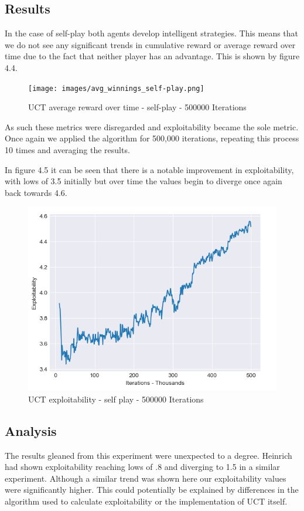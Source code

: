 \subsection{Results}\label{subsec:results2}
In the case of self-play both agents develop intelligent strategies.
This means that we do not see any significant trends in cumulative reward or average reward over time
due to the fact that neither player has an advantage.
This is shown by figure 4.4.
\begin{figure}[ht]
    \texttt{[image: images/avg\_winnings\_self-play.png]}
    \caption{UCT average reward over time - self-play - 500000 Iterations}
\end{figure}
As such these metrics were disregarded and exploitability became the sole metric.
Once again we applied the algorithm for 500,000 iterations, repeating this process 10 times
and averaging the results.

In figure 4.5 it can be seen that there is a notable improvement in exploitability, with lows of 3.5 initially
but over time the values begin to diverge once again back towards 4.6.

\begin{figure}[ht]
    \includegraphics[scale=.7]{images/exploitability_self-play_deterministic_500000.png}
    \caption{UCT exploitability - self play - 500000 Iterations}
\end{figure}

\subsection{Analysis}\label{subsec:analysis2}
The results gleaned from this experiment were unexpected to a degree.
Heinrich had shown exploitability reaching lows of .8 and diverging to 1.5 in a similar experiment.
Although a similar trend was shown here our exploitability values were significantly higher.
This could potentially be explained by differences in the algorithm used to calculate exploitability
or the implementation of UCT itself.

